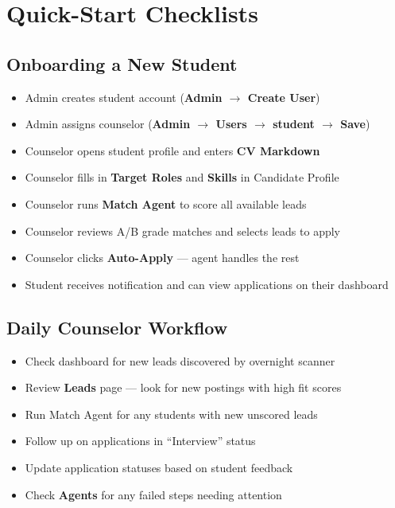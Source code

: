 \documentclass[11pt, a4paper]{article}
\newcommand{\nav}[1]{\textbf{\textcolor{accent}{#1}}}
\begin{document}
\section{Quick-Start Checklists}

\subsection{Onboarding a New Student}

\begin{itemize}[label=$\square$]
  \item Admin creates student account (\nav{Admin $\rightarrow$ Create User})
  \item Admin assigns counselor (\nav{Admin $\rightarrow$ Users $\rightarrow$ student $\rightarrow$ Save})
  \item Counselor opens student profile and enters \textbf{CV Markdown}
  \item Counselor fills in \textbf{Target Roles} and \textbf{Skills} in Candidate Profile
  \item Counselor runs \textbf{Match Agent} to score all available leads
  \item Counselor reviews A/B grade matches and selects leads to apply
  \item Counselor clicks \textbf{Auto-Apply} — agent handles the rest
  \item Student receives notification and can view applications on their dashboard
\end{itemize}

\subsection{Daily Counselor Workflow}

\begin{itemize}[label=$\square$]
  \item Check dashboard for new leads discovered by overnight scanner
  \item Review \nav{Leads} page — look for new postings with high fit scores
  \item Run Match Agent for any students with new unscored leads
  \item Follow up on applications in ``Interview'' status
  \item Update application statuses based on student feedback
  \item Check \nav{Agents} for any failed steps needing attention
\end{itemize}
\end{document}
